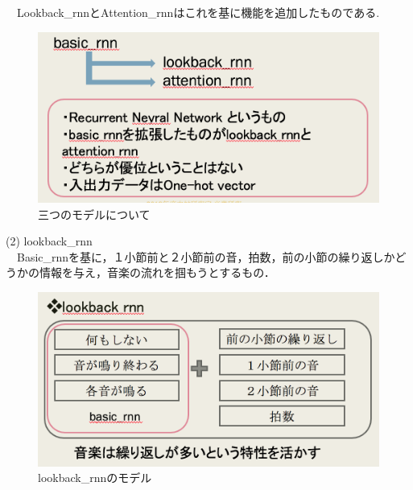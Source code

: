 　Lookback\_rnnとAttention\_rnnはこれを基に機能を追加したものである.
\begin{figure}[!ht]
    \begin{screen}
    \begin{center}
        \includegraphics[scale=0.8,clip]{./img/basic1.png}
        \caption{三つのモデルについて}
        \label{fig:Melody_RNNについて}
    \end{center}
    \end{screen}
\end{figure}
\newpage
(2) lookback\_rnn\\
　Basic\_rnnを基に，１小節前と２小節前の音，拍数，前の小節の繰り返しかどうかの情報を与え，音楽の流れを掴もうとするもの．\\
\begin{figure}[!ht]
    \begin{screen}
    \begin{center}
        \includegraphics[scale=0.8,clip]{./img/lookback1.png}
        \caption{lookback\_rnnのモデル}
        \label{fig:lookback_rnnのモデル}
    \end{center}
    \end{screen}
\end{figure}\\
